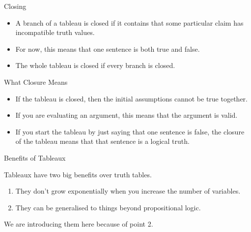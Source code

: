 \documentclass[
  ignorenonframetext,
]{beamer}
\providecommand{\tightlist}{%
  \setlength{\itemsep}{0pt}\setlength{\parskip}{0pt}}
\renewcommand{\,}{\text{, }}
\begin{document}
\begin{frame}{Closing}
\protect\hypertarget{closing}{}

\begin{itemize}
\tightlist
\item
  A branch of a tableau is closed if it contains that some particular
  claim has incompatible truth values.
\item
  For now, this means that one sentence is both true and false.\pause
\item
  The whole tableau is closed if every branch is closed.
\end{itemize}

\end{frame}

\begin{frame}{What Closure Means}
\protect\hypertarget{what-closure-means}{}

\begin{itemize}
\tightlist
\item
  If the tableau is closed, then the initial assumptions cannot be true
  together.
\item
  If you are evaluating an argument, this means that the argument is
  valid.\pause
\item
  If you start the tableau by just saying that one sentence is false,
  the closure of the tableau means that that sentence is a logical
  truth.
\end{itemize}

\end{frame}

\begin{frame}{Benefits of Tableaux}
\protect\hypertarget{benefits-of-tableaux}{}

Tableaux have two big benefits over truth tables.

\begin{enumerate}
\tightlist
\item
  They don't grow exponentially when you increase the number of
  variables.\pause
\item
  They can be generalised to things beyond propositional logic.
\end{enumerate}

We are introducing them here because of point 2.

\end{frame}
\end{document}
